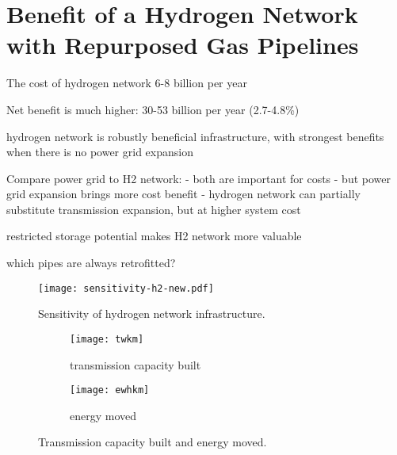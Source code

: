 \section*{Benefit of a Hydrogen Network with Repurposed Gas Pipelines}
\label{sec:h2}

The cost of hydrogen network 6-8 billion per year

Net benefit is much higher: 30-53 billion per year (2.7-4.8\%)

hydrogen network is robustly beneficial infrastructure, with strongest benefits when there is no power grid expansion

Compare power grid to H2 network:
- both are important for costs
- but power grid expansion brings more cost benefit
- hydrogen network can partially substitute transmission expansion, but at higher system cost

restricted storage potential makes H2 network more valuable

which pipes are always retrofitted?

\begin{SCfigure}
    \centering
    \texttt{[image: sensitivity-h2-new.pdf]}
    \caption{Sensitivity of hydrogen network infrastructure.}
    \label{fig:sensitivity-h2}
\end{SCfigure}


\begin{figure}
    \centering
    \begin{subfigure}[t]{0.49\textwidth}
        \centering
        \caption{transmission capacity built}
        \texttt{[image: twkm]}
    \end{subfigure}
    \begin{subfigure}[t]{0.49\textwidth}
        \centering
        \caption{energy moved}
        \texttt{[image: ewhkm]}
    \end{subfigure}
    \caption{Transmission capacity built and energy moved.}
    \label{fig:twkm}
\end{figure}


